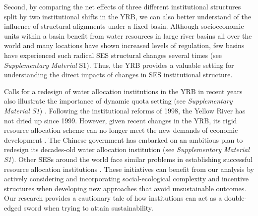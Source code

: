 Second, by comparing the net effects of three different institutional structures split by two institutional shifts in the YRB, we can also better understand of the influence of structural alignments under a fixed basin. Although socioeconomic units within a basin benefit from water resources in large river basins all over the world and many locations have shown increased levels of regulation, few basins have experienced such radical SES structural changes several times (see \textit{Supplementary Material} S1). Thus, the YRB provides a valuable setting for understanding the direct impacts of changes in SES institutional structure.

Calls for a redesign of water allocation institutions in the YRB in recent years also illustrate the importance of dynamic quota setting (see \textit{Supplementary Material S1}) \cite{yuAdaptabilityassessmentpromotion2019}. Following the institutional reforms of 1998, the Yellow River has not dried up since 1999. However, given recent changes in the YRB, its rigid resource allocation scheme can no longer meet the new demands of economic development \cite{wangThingsCurrentSignificance2019}. The Chinese government has embarked on an ambitious plan to redesign its decades-old water allocation institution (see \textit{Supplementary Material S1}). Other SESs around the world face similar problems in establishing successful resource allocation institutions \cite{cummingQuantifyingSocialEcologicalScale2020, muneepeerakulStrategicbehaviorsgovernance2017, cummingAdvancingunderstandingnatural2020, leslieOperationalizingsocialecologicalsystems2015}. These initiatives can benefit from our analysis by actively considering and incorporating social-ecological complexity and incentive structures when developing new approaches that avoid unsustainable outcomes. Our research provides a cautionary tale of how institutions can act as a double-edged sword when trying to attain sustainability.
